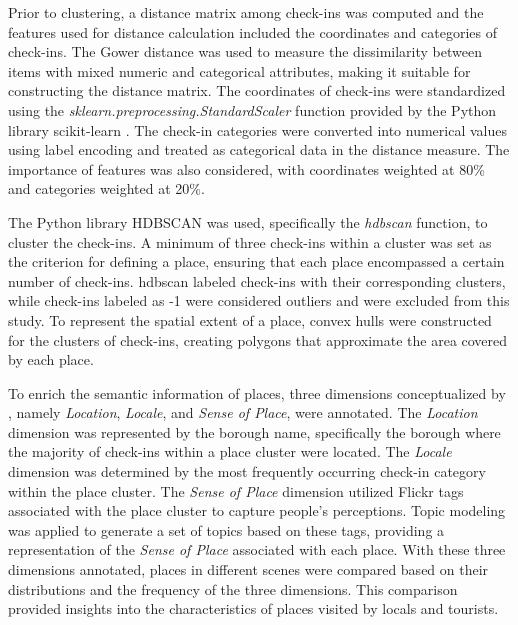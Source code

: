 \documentclass{article}
\theoremstyle{definition}
\theoremstyle{remark}
\begin{document}
Prior to clustering, a distance matrix among check-ins was computed and the features used for distance calculation included the coordinates and categories of check-ins. The Gower distance \citep{gower_general_1971} was used to measure the dissimilarity between items with mixed numeric and categorical attributes, making it suitable for constructing the distance matrix. The coordinates of check-ins were standardized using the \textit{sklearn.preprocessing.StandardScaler} function provided by the Python library scikit-learn \citep{pedregosa_scikit-learn_2011}. The check-in categories were converted into numerical values using label encoding and treated as categorical data in the distance measure. The importance of features was also considered, with coordinates weighted at 80\% and categories weighted at 20\%.

The Python library HDBSCAN \citep{mcinnes_hdbscan_2017} was used, specifically the \textit{hdbscan} function, to cluster the check-ins. A minimum of three check-ins within a cluster was set as the criterion for defining a place, ensuring that each place encompassed a certain number of check-ins. \acrshort{hdbscan} labeled check-ins with their corresponding clusters, while check-ins labeled as -1 were considered outliers and were excluded from this study. To represent the spatial extent of a place, convex hulls were constructed for the clusters of check-ins, creating polygons that approximate the area covered by each place.

To enrich the semantic information of places, three dimensions conceptualized by \cite{agnew_space_2011}, namely \textit{Location}, \textit{Locale}, and \textit{Sense of Place}, were annotated. The \textit{Location} dimension was represented by the borough name, specifically the borough where the majority of check-ins within a place cluster were located. The \textit{Locale} dimension was determined by the most frequently occurring check-in category within the place cluster. The \textit{Sense of Place} dimension utilized Flickr tags associated with the place cluster to capture people's perceptions. Topic modeling was applied to generate a set of topics based on these tags, providing a representation of the \textit{Sense of Place} associated with each place. With these three dimensions annotated, places in different scenes were compared based on their distributions and the frequency of the three dimensions. This comparison provided insights into the characteristics of places visited by locals and tourists.

\end{document}
